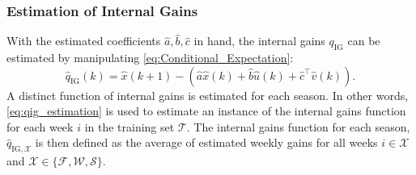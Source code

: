 \subsubsection{Estimation of Internal Gains}
With the estimated coefficients $\hat{a}, \hat{b}, \hat{c}$ in hand, the internal gains $q_{\text{IG}}$ can be estimated by manipulating \eqref{eq:Conditional_Expectation}: 
\begin{equation}\label{eq:qig_estimation}
\hat{q}_{\text{IG}}(k) = \hat{x}(k+1) - \left(\hat{a}\hat{x}(k) + \hat{b}\hat{u}(k) + \hat{c}^\top \hat{v}(k)\right).
\end{equation}
A distinct function of internal gains is estimated for each season. In other words, \eqref{eq:qig_estimation} is used to estimate an instance of the internal gains function for each week $i$ in the training set $\mathcal{T}$. The internal gains function for each season, $\hat{q}_{\text{IG},\mathcal{X}}$ is then defined as the average of estimated weekly gains for all weeks $i \in \mathcal{X}$ and $\mathcal{X} \in \{ \mathcal{F}, \mathcal{W}, \mathcal{S} \}$.


